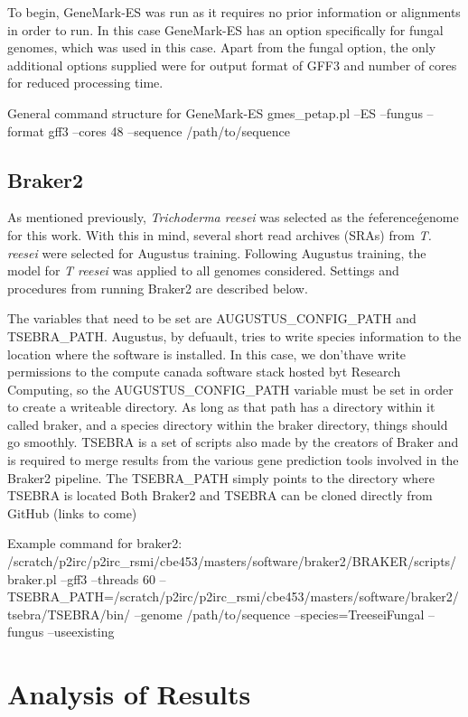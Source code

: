 \documentclass[12pt]{article}
\begin{document}
To begin, GeneMark-ES was run as it requires no prior information or
alignments in order to run. In this case GeneMark-ES has an option
specifically for fungal genomes, which was used in this case. Apart
from the fungal option, the only additional options supplied were for
output format of GFF3 and number of cores for reduced processing time.

General command structure for GeneMark-ES gmes\_petap.pl --ES --fungus
--format gff3 --cores 48 --sequence /path/to/sequence

\subsection{Braker2}

As mentioned previously, \textit{Trichoderma reesei} was selected as
the \'reference\' genome for this work. With this in mind, several
short read archives (SRAs) from \textit{T. reesei} were selected for
Augustus training. Following Augustus training, the model for
\textit{T reesei} was applied to all genomes considered. Settings and
procedures from running Braker2 are described below.

The variables that need to be set are AUGUSTUS\_CONFIG\_PATH and
TSEBRA\_PATH. Augustus, by defuault, tries to write species
information to the location where the software is installed. In this
case, we don'thave write permissions to the compute canada software
stack hosted byt Research Computing, so the AUGUSTUS\_CONFIG\_PATH
variable must be set in order to create a writeable directory. As long
as that path has a directory within it called braker, and a species
directory within the braker directory, things should go
smoothly. TSEBRA is a set of scripts also made by the creators of
Braker and is required to merge results from the various gene
prediction tools involved in the Braker2 pipeline. The TSEBRA\_PATH
simply points to the directory where TSEBRA is located Both Braker2
and TSEBRA can be cloned directly from GitHub (links to come)

Example command for braker2:
/scratch/p2irc/p2irc\_rsmi/cbe453/masters/software/braker2/BRAKER/scripts/braker.pl
--gff3 --threads 60
--TSEBRA\_PATH=/scratch/p2irc/p2irc\_rsmi/cbe453/masters/software/braker2/tsebra/TSEBRA/bin/
--genome /path/to/sequence --species=TreeseiFungal --fungus
--useexisting

\section{Analysis of Results}
\end{document}
